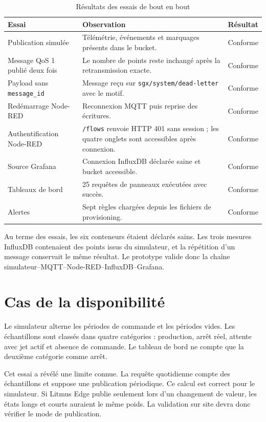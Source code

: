 \begin{table}[H]
\centering
\caption{Résultats des essais de bout en bout}
\begin{tabularx}{\textwidth}{p{}Yp{0.16\textwidth}}
\toprule
Essai & Observation & Résultat \\
\midrule
Publication simulée &
Télémétrie, événements et marquages présents dans le bucket. &
Conforme \\
Message QoS 1 publié deux fois &
Le nombre de points reste inchangé après la retransmission exacte. &
Conforme \\
Payload sans \texttt{message\_id} &
Message reçu sur \texttt{sgx/system/dead-letter} avec le motif. &
Conforme \\
Redémarrage Node-RED &
Reconnexion MQTT puis reprise des écritures. &
Conforme \\
Authentification Node-RED &
\texttt{/flows} renvoie HTTP 401 sans session ; les quatre onglets sont
accessibles après connexion. &
Conforme \\
Source Grafana &
Connexion InfluxDB déclarée saine et bucket accessible. &
Conforme \\
Tableaux de bord &
25 requêtes de panneaux exécutées avec succès. &
Conforme \\
Alertes &
Sept règles chargées depuis les fichiers de provisioning. &
Conforme \\
\bottomrule
\end{tabularx}
\end{table}

\begin{resultbox}
Au terme des essais, les six conteneurs étaient déclarés sains. Les trois
mesures InfluxDB contenaient des points issus du simulateur, et la répétition
d'un message conservait le même résultat. Le prototype valide donc la chaîne
simulateur--MQTT--Node-RED--InfluxDB--Grafana.
\end{resultbox}

\section{Cas de la disponibilité}

Le simulateur alterne les périodes de commande et les périodes vides. Les
échantillons sont classés dans quatre catégories : production, arrêt réel,
attente avec jet actif et absence de commande. Le tableau de bord ne compte
que la deuxième catégorie comme arrêt.

Cet essai a révélé une limite connue. La requête quotidienne compte des
échantillons et suppose une publication périodique. Ce calcul est correct pour
le simulateur. Si Litmus Edge publie seulement lors d'un changement de valeur,
les états longs et courts auraient le même poids. La validation sur site devra
donc vérifier le mode de publication.

